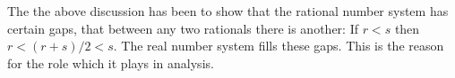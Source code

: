 \documentclass[
  leqno, 
  theme = Fresh Green,
  font = source-han,
  lang = en,
  usesamecnt
]{elegantbook-l3}
\newcounter{notemark}
\begin{document}
\begin{remark}
  The  the above discussion has been to show that the rational number system has certain gaps,  that between any two rationals there is another: If $r < s$ then $r < (r+s)/2 < s$. The real number system fills these gaps. This is the  reason for the  role which it plays in analysis. 
\end{remark}

\shownotemarks
\end{document}

